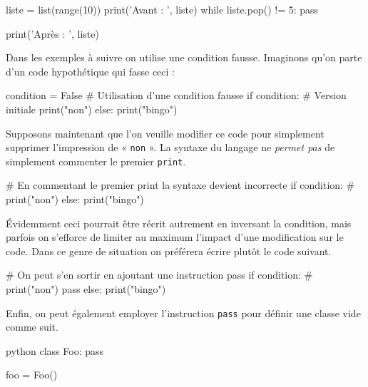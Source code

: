 \begin{idleconsole}
\begin{pyconsole}
liste = list(range(10))
print('Avant : ', liste)
while liste.pop() != 5:
    pass

print('Après : ', liste)
\end{pyconsole}
\end{idleconsole}

Dans les exemples à suivre on utilise une condition fausse. Imaginons qu'on parte d'un code hypothétique qui fasse ceci :

\begin{idleconsole}
\begin{pyconsole}
condition = False # Utilisation d'une condition fausse
if condition: # Version initiale
    print("non")
else:
    print("bingo")

\end{pyconsole}
\end{idleconsole}

Supposons maintenant que l'on veuille modifier ce code pour simplement supprimer l'impression de « \texttt{non} ». La syntaxe du langage ne \emph{permet pas} de simplement commenter le premier \texttt{print}.

\begin{idleconsole}
\begin{pyconsole}
# En commentant le premier print la syntaxe devient incorrecte
if condition: 
#    print("non")
else:
    print("bingo")

\end{pyconsole}
\end{idleconsole}

Évidemment ceci pourrait être récrit autrement en inversant la con\-dition, mais parfois on s'efforce de limiter au maximum l'impact d'une modification sur le code. Dans ce genre de situation on préférera écrire plutôt le code suivant.

\begin{idleconsole}
\begin{pyconsole}
# On peut s'en sortir en ajoutant une instruction pass
if condition: 
#    print("non")
    pass
else:
    print("bingo")

\end{pyconsole}
\end{idleconsole}

Enfin, on peut également employer l'instruction \texttt{pass} pour définir une classe vide comme suit.

\begin{codebox}{python}
class Foo:
    pass
    
foo = Foo()
\end{codebox}

